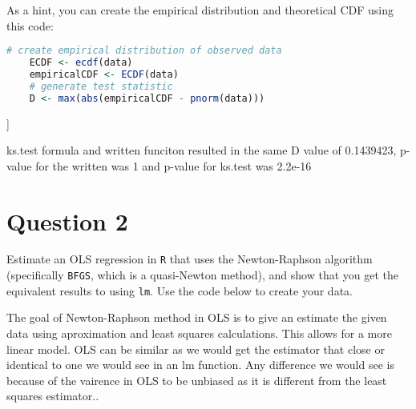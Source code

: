\documentclass[12pt,letterpaper]{article}
\begin{document}
	
\noindent As a hint, you can create the empirical distribution and theoretical CDF using this code:

\begin{lstlisting}[language=R]
	# create empirical distribution of observed data
	ECDF <- ecdf(data)
	empiricalCDF <- ECDF(data)
	# generate test statistic
	D <- max(abs(empiricalCDF - pnorm(data))) \end{lstlisting}



		]
		
\noindent ks.test formula and written funciton resulted in the same D value of 0.1439423, p-value for the written was 1 and p-value for ks.test was 2.2e-16

\vspace{3in}
\section*{Question 2}
\noindent Estimate an OLS regression in \texttt{R} that uses the Newton-Raphson algorithm (specifically \texttt{BFGS}, which is a quasi-Newton method), and show that you get the equivalent results to using \texttt{lm}. Use the code below to create your data.
\vspace{.5cm}
 
\noindent The goal of Newton-Raphson method in OLS is to give an estimate the given data using aproximation and least squares calculations. This allows for a more linear model. OLS can be similar as we would get the estimator that close or identical to one we would see in an lm function. Any difference we would see is because of the vairence in OLS to be unbiased as it is different from the least squares estimator..
\end{document}
